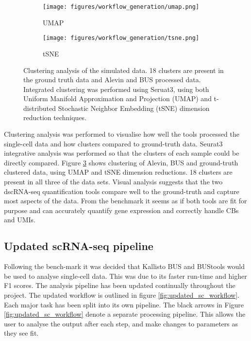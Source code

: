 \begin{figure}[ht]
\centering
\begin{subfigure}{0.7\textwidth}
    \texttt{[image: figures/workflow\_generation/umap.png]}
    \caption{UMAP}
    \label{fig:benchmark_UMAP}
\end{subfigure}
\medskip
\begin{subfigure}{0.7\textwidth}
    \texttt{[image: figures/workflow\_generation/tsne.png]}
    \caption{tSNE}
    \label{fig:benchmark_tsne}
\end{subfigure}
\caption[Benchmark Clustering Analysis]{Clustering analysis of the simulated data.
18 clusters are present in the ground truth data and Alevin and BUS processed data.
Integrated clustering was performed using Seruat3\cite{stuart2019comprehensive}, using both Uniform Manifold Approximation and Projection (UMAP) and  t-distributed Stochastic Neighbor Embedding (tSNE) dimension reduction techniques.}
\label{fig:benchmark_clustering}
\end{figure}

Clustering analysis was performed to visualise how well the tools processed the single-cell data and how clusters compared to ground-truth data.
Seurat3 integrative analysis was performed so that the clusters of each sample could be directly compared.
Figure \ref{fig:benchmark_clustering} shows clustering of Alevin, BUS and ground-truth clustered data, using UMAP and tSNE dimension reductions.
18 clusters are present in all three of the data sets.
Visual analysis suggests that the two dscRNA-seq quantification tools compare well to the ground-truth and capture most aspects of the data.
From the benchmark it seems as if both tools are fit for purpose and can accurately quantify gene expression and correctly handle CBs and UMIs.

\afterpage{\clearpage}


\subsection{Updated scRNA-seq pipeline}
Following the bench-mark it was decided that Kallisto BUS and BUStools would be used to analyse single-cell data.
This was due to its faster run-time and higher F1 scores.
The analysis pipeline has been updated continually throughout the project.
The updated workflow is outlined in figure \ref{fig:updated_sc_workflow}.
Each major task has been split into its own pipeline.
The black arrows in Figure \ref{fig:updated_sc_workflow} denote a separate processing pipeline.
This allows the user to analyse the output after each step, and make changes to parameters as they see fit.

